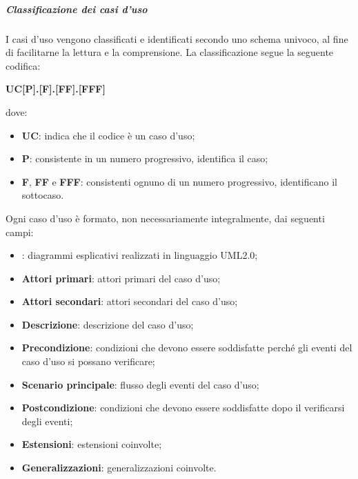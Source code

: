 \documentclass[../norme-di-progetto.tex]{subfiles}
\begin{document}
\subparagraph{Classificazione dei casi d'uso}
I casi d'uso vengono classificati e identificati secondo uno schema univoco, al fine di facilitarne la lettura e la comprensione. La classificazione segue la seguente codifica: \\
\begin{center}
  \centering
  \textbf{UC[P].[F].[FF].[FFF]}
\end{center} dove:
\begin{itemize}
  \item \textbf{UC}: indica che il codice è un caso d'uso;
  \item \textbf{P}: consistente in un numero progressivo, identifica il caso;
  \item \textbf{F}, \textbf{FF} e \textbf{FFF}: consistenti ognuno di un numero progressivo, identificano il sottocaso.
\end{itemize}
Ogni caso d'uso è formato, non necessariamente integralmente, dai seguenti campi:
\begin{itemize}
  \item \textbf{}: diagrammi esplicativi realizzati in linguaggio UML2.0;
  \item \textbf{Attori primari}: attori primari del caso d'uso;
  \item \textbf{Attori secondari}: attori secondari del caso d'uso;
  \item \textbf{Descrizione}: descrizione del caso d'uso;
  \item \textbf{Precondizione}: condizioni che devono essere soddisfatte perché gli eventi del caso d'uso si possano verificare;
  \item \textbf{Scenario principale}: flusso degli eventi del caso d'uso;
  \item \textbf{Postcondizione}: condizioni che devono essere soddisfatte dopo il verificarsi degli eventi;
  \item \textbf{Estensioni}: estensioni coinvolte;
  \item \textbf{Generalizzazioni}: generalizzazioni coinvolte.
\end{itemize}
\end{document}
